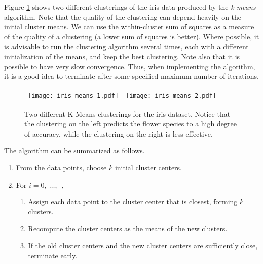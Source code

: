Figure \ref{fig:iris_clusterings} shows two different clusterings of the iris data produced by the \emph{k-means} algorithm.
Note that the quality of the clustering can depend heavily on the initial cluster means.
We can use the within-cluster sum of squares as a measure of the quality of a clustering (a lower sum of squares is better).
Where possible, it is advisable to run the clustering algorithm several times, each with a different initialization of the means,
and keep the best clustering.
Note also that it is possible to have very slow convergence.
Thus, when implementing the algorithm, it is a good idea to terminate after some specified maximum number of iterations.
%
\begin{figure}[h]
    \centering
    \begin{tabular}{cc}
    \texttt{[image: iris\_means\_1.pdf]} &
    \texttt{[image: iris\_means\_2.pdf]}
    \end{tabular}
    \caption{Two different K-Means clusterings for the iris dataset.
            Notice that the clustering on the left predicts the flower species to a high degree of accuracy,
            while the clustering on the right is less effective.}
    \label{fig:iris_clusterings}
\end{figure}

The algorithm can be summarized as follows.
\begin{enumerate}
    \item From the data points, choose $k$ initial cluster centers.
    \item For $i=0,\ \ldots,$\ ,
    \begin{enumerate}
        \item Assign each data point to the cluster center that is closest, forming $k$ clusters.
        \item Recompute the cluster centers as the means of the new clusters.
        \item If the old cluster centers and the new cluster centers are sufficiently close, terminate early.
    \end{enumerate}
\end{enumerate}


